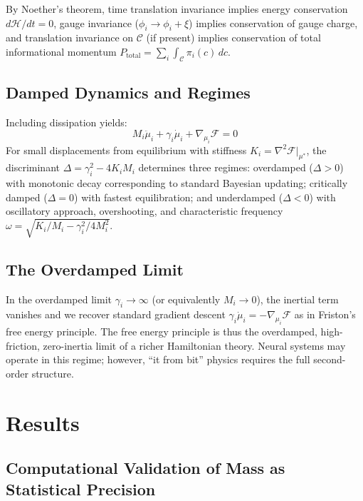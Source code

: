 \documentclass[11pt]{article}
\begin{document}
By Noether's theorem, time translation invariance implies energy conservation $d\mathcal{H}/dt = 0$, gauge invariance ($\phi_i \to \phi_i + \xi$) implies conservation of gauge charge, and translation invariance on $\mathcal{C}$ (if present) implies conservation of total informational momentum $P_{\mathrm{total}} = \sum_i \int_{\mathcal{C}} \pi_i(c)\, dc$.

\subsection{Damped Dynamics and Regimes}

Including dissipation yields:
\begin{equation}
M_i \ddot{\mu}_i + \gamma_i \dot{\mu}_i + \nabla_{\mu_i}\mathcal{F} = 0
\label{eq:damped}
\end{equation}
For small displacements from equilibrium with stiffness $K_i = \nabla^2\mathcal{F}|_{\mu^*}$, the discriminant $\Delta = \gamma_i^2 - 4K_i M_i$ determines three regimes: overdamped ($\Delta > 0$) with monotonic decay corresponding to standard Bayesian updating; critically damped ($\Delta = 0$) with fastest equilibration; and underdamped ($\Delta < 0$) with oscillatory approach, overshooting, and characteristic frequency $\omega = \sqrt{K_i/M_i - \gamma_i^2/4M_i^2}$.

\subsection{The Overdamped Limit}

In the overdamped limit $\gamma_i \to \infty$ (or equivalently $M_i \to 0$), the inertial term vanishes and we recover standard gradient descent $\gamma_i \dot{\mu}_i = -\nabla_{\mu_i}\mathcal{F}$ as in Friston's free energy principle. The free energy principle is thus the overdamped, high-friction, zero-inertia limit of a richer Hamiltonian theory. Neural systems may operate in this regime; however, ``it from bit'' physics requires the full second-order structure.


\section{Results}
\label{sec:experiments}


\subsection{Computational Validation of Mass as Statistical Precision}
\end{document}
